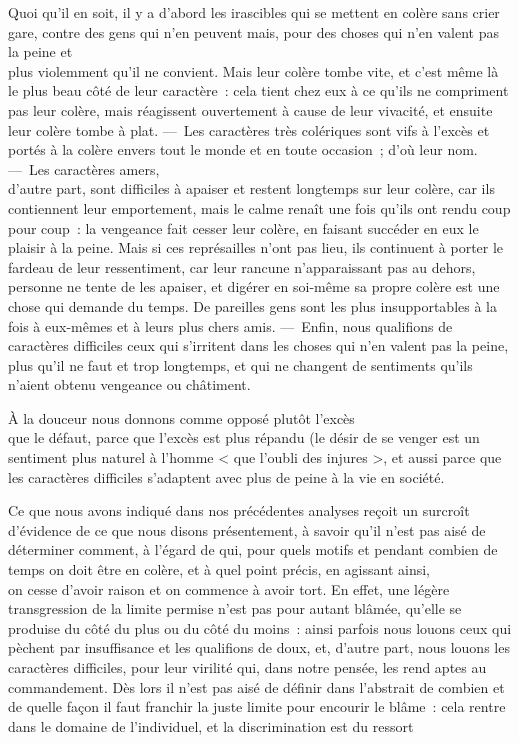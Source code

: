 \documentclass[french,twoside]{book} %
\begin{document}
Quoi qu’il en soit, il y a d’abord les irascibles qui se mettent en colère sans crier gare, contre des gens qui n’en peuvent mais, pour des choses qui n’en valent pas la peine et \\
plus violemment qu’il ne convient. Mais leur colère tombe vite, et c’est même là le plus beau côté de leur caractère : cela tient chez eux à ce qu’ils ne compriment pas leur colère, mais réagissent ouvertement à cause de leur vivacité, et ensuite leur colère tombe à plat. — Les caractères très colériques sont vifs à l’excès et portés à la colère envers tout le monde et en toute occasion ; d’où leur nom. — Les caractères amers, \\
d’autre part, sont difficiles à apaiser et restent longtemps sur leur colère, car ils contiennent leur emportement, mais le calme renaît une fois qu’ils ont rendu coup pour coup : la vengeance fait cesser leur colère, en faisant succéder en eux le plaisir à la peine. Mais si ces représailles n’ont pas lieu, ils continuent à porter le fardeau de leur ressentiment, car leur rancune n’apparaissant pas au dehors, personne ne tente de les apaiser, et digérer en soi-même sa propre colère est une \\
chose qui demande du temps. De pareilles gens sont les plus insupportables à la fois à eux-mêmes et à leurs plus chers amis. — Enfin, nous qualifions de caractères difficiles ceux qui s’irritent dans les choses qui n’en valent pas la peine, plus qu’il ne faut et trop longtemps, et qui ne changent de sentiments qu’ils n’aient obtenu vengeance ou châtiment.\par
À la douceur nous donnons comme opposé plutôt l’excès \\
que le défaut, parce que l’excès est plus répandu (le désir de se venger est un sentiment plus naturel à l’homme < que l’oubli des injures >, et aussi parce que les caractères difficiles s’adaptent avec plus de peine à la vie en société.\par
Ce que nous avons indiqué dans nos précédentes analyses reçoit un surcroît d’évidence de ce que nous disons présentement, à savoir qu’il n’est pas aisé de déterminer comment, à l’égard de qui, pour quels motifs et pendant combien de temps on doit être en colère, et à quel point précis, en agissant ainsi, \\
on cesse d’avoir raison et on commence à avoir tort. En effet, une légère transgression de la limite permise n’est pas pour autant blâmée, qu’elle se produise du côté du plus ou du côté du moins : ainsi parfois nous louons ceux qui pèchent par insuffisance  et les qualifions de doux, et, d’autre part, nous louons les caractères difficiles, pour leur virilité qui, dans notre pensée, les rend aptes au commandement. Dès lors il n’est pas aisé de définir dans l’abstrait de combien et de quelle façon il faut franchir la juste limite pour encourir le blâme : cela rentre dans le domaine de l’individuel, et la discrimination est du ressort \\
\end{document}
